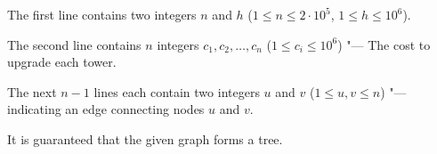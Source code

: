The first line contains two integers $n$ and $h$ ($1 \le n \le 2 \cdot 10^5$, $1 \le h \le 10^6$).

The second line contains $n$ integers $c_1, c_2, \ldots, c_n$ ($1 \le c_i \le 10^6$) "--- The cost to upgrade each tower.

The next $n-1$ lines each contain two integers $u$ and $v$ ($1 \le u, v \le n$) "--- indicating an edge connecting nodes $u$ and $v$.

It is guaranteed that the given graph forms a tree.
